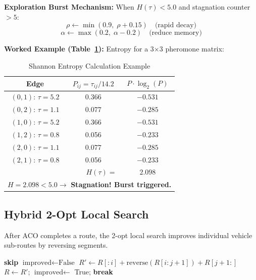 \documentclass[10pt,conference]{IEEEtran}
\begin{document}
\textbf{Exploration Burst Mechanism:} When $H(\tau) < 5.0$ and stagnation counter $> 5$:
\begin{equation}
    \rho \leftarrow \min(0.9, \; \rho + 0.15) \quad \text{(rapid decay)}
\end{equation}
\begin{equation}
    \alpha \leftarrow \max(0.2, \; \alpha - 0.2) \quad \text{(reduce memory)}
\end{equation}

\textbf{Worked Example (Table~\ref{tab:entropy_calc}):} Entropy for a 3$\times$3 pheromone matrix:

\begin{table}[h]
\caption{Shannon Entropy Calculation Example}
\label{tab:entropy_calc}
\begin{center}
\begin{tabular}{|c|c|c|}
\hline
\textbf{Edge} & $P_{ij} = \tau_{ij}/14.2$ & $P \cdot \log_2(P)$ \\
\hline
$(0,1)$: $\tau=5.2$ & 0.366 & $-0.531$ \\
$(0,2)$: $\tau=1.1$ & 0.077 & $-0.285$ \\
$(1,0)$: $\tau=5.2$ & 0.366 & $-0.531$ \\
$(1,2)$: $\tau=0.8$ & 0.056 & $-0.233$ \\
$(2,0)$: $\tau=1.1$ & 0.077 & $-0.285$ \\
$(2,1)$: $\tau=0.8$ & 0.056 & $-0.233$ \\
\hline
\multicolumn{2}{|r|}{\textbf{$H(\tau) = $}} & $\mathbf{2.098}$ \\
\hline
\multicolumn{3}{|l|}{$H = 2.098 < 5.0 \rightarrow$ \textbf{Stagnation! Burst triggered.}} \\
\hline
\end{tabular}
\end{center}
\end{table}

\subsection{Hybrid 2-Opt Local Search}
After ACO completes a route, the 2-opt local search improves individual vehicle sub-routes by reversing segments.

\begin{algorithm}[h]
\caption{2-Opt Intra-Route Local Search}
\begin{algorithmic}[1]
     \STATE \textbf{skip} \ENDIF
    \REPEAT
        \STATE $\text{improved} \leftarrow \text{False}$
                \STATE $R' \leftarrow R[:i] + \text{reverse}(R[i:j+1]) + R[j+1:]$
                    \STATE $R \leftarrow R'$; $\text{improved} \leftarrow$ True; \textbf{break}
                \ENDIF
            \ENDFOR
        \ENDFOR
\ENDFOR
\end{algorithmic}
\end{algorithm}
\end{document}
